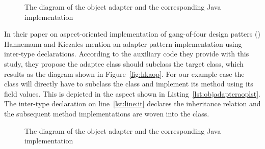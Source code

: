 \begin{figure}
\centering
{}
\hfill
{}
\vfill
{}
\caption{The diagram of the object adapter and the corresponding Java implementation}
\end{figure}

In their paper on aspect-oriented implementation of gang-of-four design patters (\cite{hannemann:oopsla02}) Hannemann and Kiczales mention an adapter pattern implementation using inter-type declarations. 
According to the auxiliary code they provide with this study, they propose the adaptee class should subclass the target class, which results as the diagram shown in Figure~\ref{fig:hkaop}. For our example case the  class will directly have to subclass the  class and implement its method using its  field values. This is depicted in the aspect shown in Listing~\ref{lst:objadapteraoplst}. The inter-type declaration on line~\ref{lst:line:it} declares the inheritance relation and the subsequent method implementations are woven into the  class.

\begin{figure}
\centering
{}
\hspace{20pt}
\vfill
{}
\caption{The diagram of the object adapter and the corresponding Java implementation}
\end{figure}

